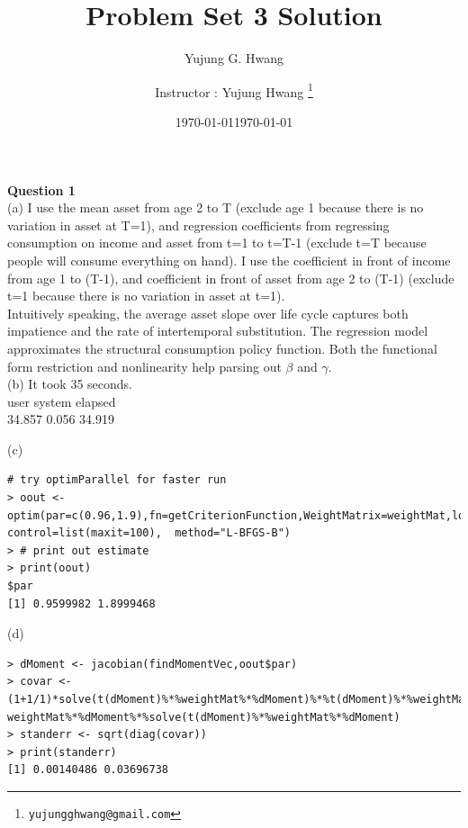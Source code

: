 \documentclass[paper=a4, fontsize=13pt]{extarticle} %
\author{Yujung G. Hwang} %
\date{\today} %
\numberwithin{equation}{section} %
\numberwithin{figure}{section} %
\numberwithin{table}{section} %
\begin{document}
\title{	
\normalfont \normalsize 
\huge Problem Set 3 Solution
}
\author{
Instructor : Yujung Hwang \thanks{\texttt{yujungghwang@gmail.com}}} %
\date{\today} %
\maketitle %

\upshape \mdseries 

\normalsize

\textbf{Question 1} \\
(a) I use the mean asset from age 2 to T (exclude age 1 because there is no variation in asset at T=1), and regression coefficients from regressing consumption on income and asset from t=1 to t=T-1 (exclude t=T because people will consume everything on hand). I use the coefficient in front of income from age 1 to (T-1), and coefficient in front of asset from age 2 to (T-1) (exclude t=1 because there is no variation in asset at t=1). \\
Intuitively speaking, the average asset slope over life cycle captures both impatience and the rate of intertemporal substitution. The regression model approximates the structural consumption policy function. Both the functional form restriction and nonlinearity help parsing out $\beta$ and $\gamma$. \\

(b) It took 35 seconds.  \\

   user  system elapsed \\
 34.857   0.056  34.919 

(c) \\
\begin{lstlisting}
# try optimParallel for faster run
> oout <- optim(par=c(0.96,1.9),fn=getCriterionFunction,WeightMatrix=weightMat,lower=lb,upper=ub,
control=list(maxit=100),  method="L-BFGS-B")
> # print out estimate
> print(oout)
$par
[1] 0.9599982 1.8999468
\end{lstlisting}

(d) \\
\begin{lstlisting}
> dMoment <- jacobian(findMomentVec,oout$par) 
> covar <- (1+1/1)*solve(t(dMoment)%*%weightMat%*%dMoment)%*%t(dMoment)%*%weightMat%*%varMat%*%
weightMat%*%dMoment%*%solve(t(dMoment)%*%weightMat%*%dMoment)
> standerr <- sqrt(diag(covar))
> print(standerr)
[1] 0.00140486 0.03696738
\end{lstlisting}
\end{document}
